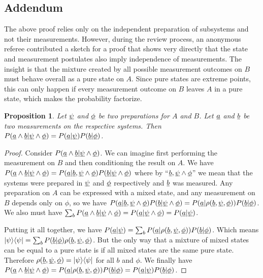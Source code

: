 \documentclass[aps,prl,amsmath,amssymb,twocolumn,nofootinbib]{revtex4}
\theoremstyle{plain}
\newtheorem{prop}[thrm]{Proposition}
\theoremstyle{definition}
\theoremstyle{remark}
\newcommand{\pj}[1] {\underbar{$#1$}}
\def\>{\rangle}
\def\<{\langle}
\begin{document}
	\subsection{Addendum}
	
	The above proof relies only on the independent preparation of subsystems and not their measurements. However, during the review process, an anonymous referee contributed a sketch for a proof that shows very directly that the state and measurement postulates also imply independence of measurements. The insight is that the mixture created by all possible measurement outcomes on $B$ must behave overall as a pure state on $A$. Since pure states are extreme points, this can only happen if every measurement outcome on $B$ leaves $A$ in a pure state, which makes the probability factorize.
	
	\begin{prop}
		Let $\pj{\psi}$ and $\pj{\phi}$ be two preparations for $A$ and $B$. Let $\pj{a}$ and $\pj{b}$ be two measurements on the respective systems. Then $P(\pj{a} \wedge \pj{b} | \pj{\psi} \wedge \pj{\phi}) = P(\pj{a} | \pj{\psi}) P(\pj{b} | \pj{\phi})$.
	\end{prop}
	\begin{proof}
		Consider $P(\pj{a} \wedge \pj{b} | \pj{\psi} \wedge \pj{\phi})$. We can imagine first performing the measurement on $B$ and then conditioning the result on $A$. We have $P(\pj{a} \wedge \pj{b} | \pj{\psi} \wedge \pj{\phi}) = P(\pj{a} | \pj{b}, \pj{\psi} \wedge \pj{\phi}) P(\pj{b} | \pj{\psi} \wedge \pj{\phi})$ where by ``$\pj{b}, \pj{\psi} \wedge \pj{\phi}$'' we mean that the systems were prepared in $\pj{\psi}$ and $\pj{\phi}$ respectively and $\pj{b}$ was measured. Any preparation on $A$ can be expressed with a mixed state, and any measurement on $B$ depends only on $\phi$, so we have $P(\pj{a} | \pj{b}, \pj{\psi} \wedge \pj{\phi}) P(\pj{b} | \pj{\psi} \wedge \pj{\phi}) = P(\pj{a} | \rho(\pj{b}, \pj{\psi}, \pj{\phi})) P(\pj{b} | \pj{\phi})$. We also must have $\sum_b P(\pj{a} \wedge \pj{b} | \pj{\psi} \wedge \pj{\phi}) = P(\pj{a} | \pj{\psi} \wedge \pj{\phi}) = P(\pj{a} | \pj{\psi})$.
		
		Putting it all together, we have $P(\pj{a} | \pj{\psi}) = \sum_b P(\pj{a} | \rho(\pj{b}, \pj{\psi}, \pj{\phi})) P(\pj{b} | \pj{\phi})$. Which means $|\psi\>\<\psi| = \sum_b P(\pj{b} | \pj{\phi}) \rho(\pj{b}, \pj{\psi}, \pj{\phi})$. But the only way that a mixture of mixed states can be equal to a pure state is if all mixed states are the same pure state. Therefore $\rho(\pj{b}, \pj{\psi}, \pj{\phi}) = |\psi\>\<\psi|$ for all $b$ and $\phi$. We finally have $P(\pj{a} \wedge \pj{b} | \pj{\psi} \wedge \pj{\phi}) = P(\pj{a} | \rho(\pj{b}, \pj{\psi}, \pj{\phi})) P(\pj{b} | \pj{\phi}) = P(\pj{a} | \pj{\psi}) P(\pj{b} | \pj{\phi})$.
	\end{proof}
	
\end{document}

